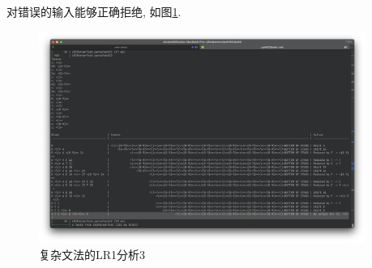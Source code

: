 对错误的输入能够正确拒绝, 如图\ref{fig:复杂文法的LR1分析3}.

\begin{figure}[ht!]
	\begin{center}
		\includegraphics[width=0.95\textwidth]{figures/lr1复杂分析3.png}
	\end{center}
	\caption{复杂文法的LR1分析3}
	\label{fig:复杂文法的LR1分析3}
\end{figure}
